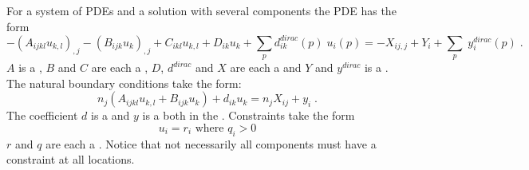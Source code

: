 For a system of PDEs and a solution with several components the PDE has the form
\begin{equation}\label{LINEARPDE.SYSTEM.1}
-(A_{ijkl} u_{k,l})_{,j}-(B_{ijk} u_{k})_{,j}+C_{ikl} u_{k,l}+D_{ik} u_{k}+
 \sum_p d^{dirac}_{ik}(p) \;  u_i(p)
 =-X_{ij,j}+Y_{i} +\sum_p \; y^{dirac}_i(p)   \; .
\end{equation}
$A$ is a \RankFour, $B$ and $C$ are each a \RankThree, $D$, $d^{dirac}$ and $X$ are each a \RankTwo and $Y$ and $y^{dirac}$ is a \RankOne.
The natural boundary conditions take the form:
\begin{equation}\label{LINEARPDE.SYSTEM.2}
n_{j}(A_{ijkl} u_{k,l}+B_{ijk} u_{k})+d_{ik} u_{k}=n_{j}X_{ij}+y_{i}  \;.
\end{equation}
The coefficient $d$ is a \RankTwo and $y$ is a \RankOne both in the
\FunctionOnBoundary. Constraints take the form
\begin{equation}\label{LINEARPDE.SYSTEM.3}
u_{i}=r_{i} \mbox{ where } q_{i}>0
\end{equation}
$r$ and $q$ are each a \RankOne. Notice that not necessarily all components
must have a constraint at all locations.

